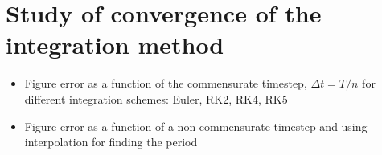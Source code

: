     \tableofcontents%

    \listoffigures %
    \listoftables \clearpage



    \setlength{\parskip}{1em plus 0.5em minus 0.2em}

    \pagestyle{fancy}
    \fancyhf{}

    \makeatletter
        \fancyhead[L]{\@title}
        \fancyfoot[C]{\@author}
        \fancyfoot[R]{\thepage}
    \makeatother

    \renewcommand{\headrulewidth}{1pt}
    \renewcommand{\footrulewidth}{0.75pt}

    
    
    
    
    \section{Study of convergence of the integration method}
    \begin{itemize}
        \item Figure error as a function of the commensurate timestep, $\Delta t = T/n$ for different integration schemes: Euler, RK2, RK4, RK5 
        \item Figure error as a function of a non-commensurate timestep and using interpolation for finding the period
    \end{itemize}
    


    \printbibliography[heading=bibintoc]






